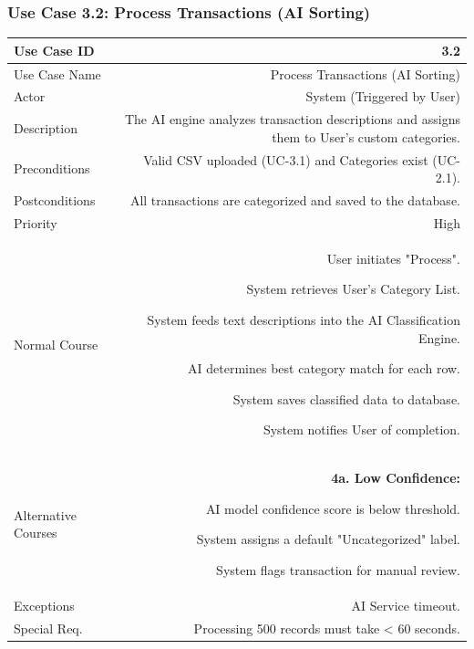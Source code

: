 \documentclass[11pt,a4paper]{report}
\begin{document}
\newpage

\subsubsection{Use Case 3.2: Process Transactions (AI Sorting)}
\begin{tabularx}{\textwidth}{|L|R|}
	\hline
	Use Case ID & 3.2 \\ \hline
	Use Case Name & Process Transactions (AI Sorting) \\ \hline
	Actor & System (Triggered by User) \\ \hline
	Description & The AI engine analyzes transaction descriptions and assigns them to User's custom categories. \\ \hline
	Preconditions & Valid CSV uploaded (UC-3.1) and Categories exist (UC-2.1). \\ \hline
	Postconditions & All transactions are categorized and saved to the database. \\ \hline
	Priority & High \\ \hline
	Normal Course & 
	\begin{normalsteps}
		\item User initiates "Process".
		\item System retrieves User's Category List.
		\item System feeds text descriptions into the AI Classification Engine.
		\item AI determines best category match for each row.
		\item System saves classified data to database.
		\item System notifies User of completion.
	\end{normalsteps} \\ \hline
	Alternative Courses & 
	\textbf{4a. Low Confidence:} 
	\begin{altsteps}
		\item AI model confidence score is below threshold.
		\item System assigns a default "Uncategorized" label.
		\item System flags transaction for manual review.
	\end{altsteps} \\ \hline
	Exceptions & AI Service timeout. \\ \hline
	Special Req. & Processing 500 records must take < 60 seconds. \\ \hline
\end{tabularx}
\end{document}
